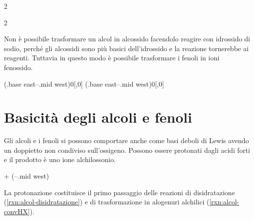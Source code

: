 \begin{reaction}
	2   
	\arrow
	 \+{1em,1em} 
\end{reaction}
\begin{reaction}
	2   
	\arrow
	 \+{1em,1em} 
\end{reaction}

Non è possibile trasformare un alcol in alcossido facendolo reagire con idrossido di sodio, perché gli alcossidi sono più basici dell'idrossido e la reazione tornerebbe ai reagenti. Tuttavia in questo modo è possibile trasformare i fenoli in ioni fenossido.
\begin{reaction}
	 \arrow(.base east--.mid west){0}[,0] \+ 
	\arrow
	 \arrow(.base east--.mid west){0}[,0]\+ 
\end{reaction}


\section{Basicità degli alcoli e fenoli}
Gli alcoli e i fenoli si possono comportare anche come basi deboli di Lewis avendo un doppietto non condiviso sull'ossigeno. Possono essere protonati dagli acidi forti e il prodotto è uno ione alchilossonio.
\begin{reaction*}
	 + 
	\arrow(--.mid west)
\end{reaction*}

La protonazione costituisce il primo passaggio delle reazioni di disidratazione (\autoref{rxn:alcol-disidratazione}) e di trasformazione in alogenuri alchilici (\autoref{rxn:alcol-convHX}).

